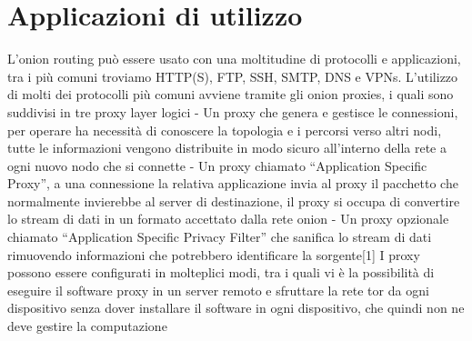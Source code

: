\section{Applicazioni di utilizzo}
L’onion routing può essere usato con una moltitudine di protocolli e applicazioni, tra i più comuni troviamo HTTP(S), FTP, SSH, SMTP, DNS e VPNs. L’utilizzo di molti dei protocolli più comuni avviene tramite gli onion proxies, i quali sono suddivisi in tre proxy layer logici
- Un proxy che genera e gestisce le connessioni, per operare ha necessità di conoscere la topologia e i percorsi verso altri nodi, tutte le informazioni vengono distribuite in modo sicuro all’interno della rete a ogni nuovo nodo che si connette 
- Un proxy chiamato “Application Specific Proxy”, a una connessione la relativa applicazione invia al proxy il pacchetto che normalmente invierebbe al server di destinazione, il proxy si occupa di convertire lo stream di dati in un formato accettato dalla rete onion
- Un proxy opzionale chiamato “Application Specific Privacy Filter” che sanifica lo stream di dati rimuovendo informazioni che potrebbero identificare la sorgente[1]
I proxy possono essere configurati in molteplici modi, tra i quali vi è la possibilità di eseguire il software proxy in un server remoto e sfruttare la rete tor da ogni dispositivo senza dover installare il software in ogni dispositivo, che quindi non ne deve gestire la computazione

 
